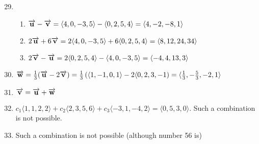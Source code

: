 \documentclass[12pt]{article}
\begin{document}
\begin{enumerate}
    \setcounter{enumi}{28}

  \item

    \begin{enumerate}

      \item $\overrightarrow{\bold{u}}-\overrightarrow{\bold{v}}=\langle 4,0,-3,5\rangle-\langle0,2,5,4\rangle=\langle4,-2,-8,1\rangle$

      \item $2\overrightarrow{\bold{u}}+6\overrightarrow{\bold{v}}=2\langle 4,0,-3,5\rangle+6\langle0,2,5,4\rangle=\langle8,12,24,34\rangle$

      \item $2\overrightarrow{\bold{v}}-\overrightarrow{\bold{u}}=2\langle0,2,5,4\rangle-\langle4,0,-3,5\rangle=\langle-4,4,13,3\rangle$

    \end{enumerate}

    \setcounter{enumi}{34}

  \item $\overrightarrow{\bold{w}}=\frac{1}{3}(\overrightarrow{\bold{u}}-2\overrightarrow{\bold{v}})=\frac{1}{3}\left( \langle1,-1,0,1\rangle-2\langle0,2,3,-1 \right)=\langle\frac{1}{3},-\frac{5}{3},-2,1\rangle$

    \setcounter{enumi}{40}

  \item $\overrightarrow{\bold{v}}=\overrightarrow{\bold{u}}+\overrightarrow{\bold{w}}$

    \setcounter{enumi}{48}

  \item $c_1\langle1,1,2,2\rangle+c_2\langle2,3,5,6\rangle+c_3\langle-3,1,-4,2\rangle=\langle0,5,3,0\rangle$. Such a combination is not possible.

    \setcounter{enumi}{54}

  \item Such a combination is not possible (although number 56 is)

\end{enumerate}
\end{document}
